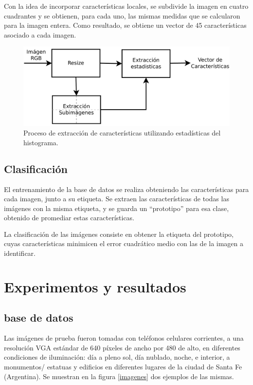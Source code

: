 \documentclass[conference,a4paper,10pt,oneside,final]{tfmpd}
\begin{document}
Con la idea de incorporar características locales,
se subdivide la imagen en cuatro 
cuadrantes y se obtienen, para cada uno, las mismas medidas que se calcularon
para  la imagen entera. Como resultado, se obtiene un vector de 45
características asociado a cada imagen.

\begin{figure}
\begin{center}
\includegraphics[scale=0.25]{../diagramas/procesoestadisticas} 
\end{center}
\caption{Proceso de extracción de características utilizando estadísticas del
histograma.}
\label{procesoestadisticas}
\end{figure}

\subsection{Clasificación}
El entrenamiento de la base de datos se realiza obteniendo las características
para cada imagen, junto a su etiqueta.
Se extraen las características de todas las imágenes 
con la misma etiqueta, y se guarda un
``prototipo'' para esa clase, obtenido de promediar estas características.

La clasificación de las imágenes consiste en
obtener la etiqueta del prototipo, cuyas características 
minimicen el error cuadrático medio con las de
la imagen a identificar.
%
%
%
%
\section{Experimentos y resultados}
%
%
\subsection{ base de datos}
Las imágenes de prueba fueron tomadas con teléfonos celulares corrientes, a una
resolución VGA estándar de 640 píxeles de ancho por 480 de alto, en
diferentes condiciones
de iluminación: día a pleno sol, día nublado, noche, e interior, a monumentos/%
estatuas y edificios en diferentes lugares de la ciudad de Santa Fe (Argentina).
Se muestran en la figura \ref{imagenes} dos ejemplos de las mismas.
%
%
\end{document}
